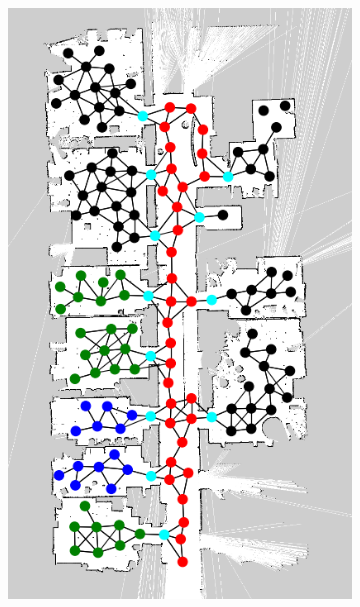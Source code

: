 \documentclass[10pt, titlepage]{article}
\theoremstyle{definition}
\begin{document}
\begin{figure}[!htb]
  \centering
  \begin{subfigure}{.3\textwidth}
  \centering
  \includegraphics[width=.8\linewidth]{images/original_topo_map}
  \caption{}
  \label{fig:orig_topo}
\end{subfigure}%
\begin{subfigure}{.3\textwidth}
  \centering

\end{subfigure}
\end{figure}
\end{document}
